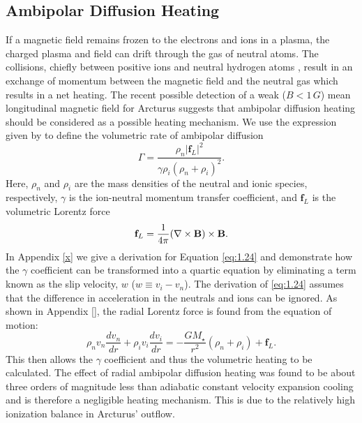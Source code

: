 \subsection{Ambipolar Diffusion Heating}\label{sec:4.1}
If a magnetic field remains frozen to the electrons and ions in a plasma, the charged plasma and field can drift through the gas of neutral atoms. The collisions, chiefly between positive ions and neutral hydrogen atoms \citep{spitzer_1978}, result in an exchange of momentum between the magnetic field and the neutral gas which results in a net heating. The recent possible detection of a weak ($B < 1\,G$) mean longitudinal magnetic field for Arcturus \citep{Sennhauser_2011} suggests that ambipolar diffusion heating should be considered as a possible heating mechanism.  We use the expression given by \cite{shang_2002} to define the volumetric rate of ambipolar  diffusion 
\begin{equation}\label{eq:1.24}
\Gamma = \frac{\rho _{n}|\mathbf{f}_{L}|^2}{\gamma \rho _{i}(\rho _{n}+\rho _{i})^2}.
\end{equation}
Here, $\rho _{n}$ and $\rho _{i}$ are the mass densities of the neutral and ionic species, respectively, $\gamma$ is the ion-neutral momentum transfer coefficient, and $\textbf{f}_{L}$ is the volumetric Lorentz force
\begin{equation}
\textbf{f}_{L}=\frac{1}{4\pi}({\bf \nabla } \times \textbf{B})\times \textbf{B}.
\end{equation}
In Appendix \ref{x} we give a derivation for Equation \ref{eq:1.24} and demonstrate how the $\gamma$ coefficient can be transformed into a quartic equation by eliminating a term known as the slip velocity, $w$ ($w\equiv v_{i}-v_{n}$). The derivation of \ref{eq:1.24} assumes that the difference in acceleration in the neutrals and ions can be ignored. As shown in Appendix \ref{}, the radial Lorentz force is found from the equation of motion:
\begin{equation}
\rho _{n}v_{n}\frac{dv_{n}}{dr}+\rho _{i}v_{i}\frac{dv_{i}}{dr}=-\frac{GM_{\star}}{r^2}(\rho _{n} + \rho _{i})+\mathbf{f}_{L}.
\end{equation}
This then allows the $\gamma$ coefficient and thus the volumetric heating to be calculated. The effect of radial ambipolar diffusion heating was found to be about three orders of magnitude less than adiabatic constant velocity expansion cooling and is therefore a negligible heating mechanism. This is due to the relatively high ionization balance in Arcturus' outflow.


